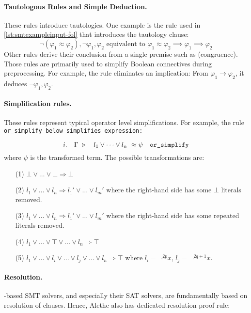 \paragraph{Tautologous Rules and Simple Deduction.}
These rules introduce tautologies. One example is the  rule used in \cref{lst:smtexampleinput-fol} that introduces the tautology clause:
\[
  \neg (\varphi_1 \approx \varphi_2), \neg \varphi_1, \varphi_2 \text{ equivalent to } \varphi_1 \approx \varphi_2 \implies  \varphi_1 \implies \varphi_2
\]
%
Other rules derive their conclusion from a single premise such as  (congruence).
%
Those rules are primarily used to simplify Boolean connectives during preprocessing.
For example, the  rule eliminates an implication: From $\varphi_1 \to \varphi_2$, it deduces $\neg \varphi_1, \varphi_2$.

\paragraph{Simplification rules.} These rules represent typical operator level simplifications.
For example, the rule \tt{or\_simplify} below simplifies  expression:

\begin{equation}
i. \quad \Gamma~\triangleright \quad l_1 \lor \dots \lor l_n ~ \approx \psi \quad \tt{or\_simplify}
\end{equation}
where $\psi$ is the transformed term. The possible transformations are:
\begin{enumerate}
\item[(1)] $\bot \lor \dots \lor \bot \Rightarrow \bot$
\item[(2)] $l_1 \lor \dots \lor l_n \Rightarrow l_1' \lor \dots \lor l_m'$ where the right-hand side has some $\bot$ literals removed.
\item[(3)]  $l_1 \lor \dots \lor l_n \Rightarrow l_1' \lor \dots \lor l_m'$ where the right-hand side has some repeated literals removed.
\item[(4)] $l_1 \lor \dots \lor \top \lor \dots \lor l_n \Rightarrow \top$
\item[(5)] $l_1 \lor \dots \lor l_i \lor \dots \lor l_j \lor \dots \lor  l_n \Rightarrow \top$ where $l_i = \neg^{2p} x$, $l_j = \neg^{2q+1} x$.
\end{enumerate}

\paragraph{Resolution.}
{\cdclt}-based SMT solvers, and especially their SAT solvers, are fundamentally based on resolution of clauses.
Hence, Alethe also has dedicated resolution proof rule:


